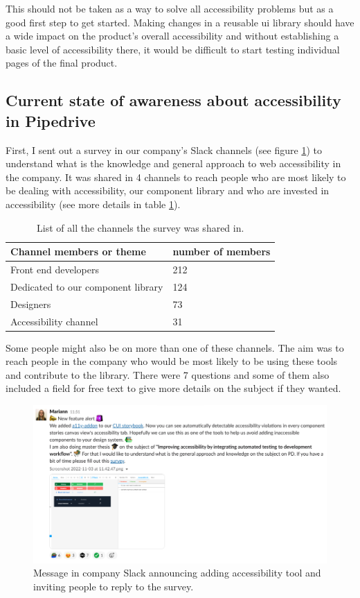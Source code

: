 \documentclass{master_thesis}
\begin{document}
This should not be taken as a way to solve all accessibility problems but as a good first step to get started. Making changes in a reusable \ac{ui} library should have a wide impact on the product's overall accessibility and without establishing a basic level of accessibility there, it would be difficult to start testing individual pages of the final product.

\subsection{Current state of awareness about accessibility in Pipedrive}

First, I sent out a survey in our company's Slack channels (see figure \ref{fig:slack-message}) to understand what is the knowledge and general approach to web accessibility in the company. It was shared in 4 channels to reach people who are most likely to be dealing with accessibility, our component library and who are invested in accessibility (see more details in table \ref{table:survey-shared}).

\begin{table}[H]
	\centering
	\begin{tabular}{|l|l|}
		\hline
		\textbf{Channel members or theme} & \textbf{number of members}  \\
		\hline
		Front end developers  & 212  \\
		\hline
		Dedicated to our component library  & 124  \\
		\hline
		Designers  & 73  \\
		\hline
		Accessibility channel  & 31  \\
		\hline
	\end{tabular}
	\caption{List of all the channels the survey was shared in.}
	\label{table:survey-shared}
\end{table}

Some people might also be on more than one of these channels. The aim was to reach people in the company who would be most likely to be using these tools and contribute to the library. There were 7 questions and some of them also included a field for free text to give more details on the subject if they wanted.

\begin{figure}[H]
	\centering
	\includegraphics[width=\textwidth]{img/survey.png}
	\caption{Message in company Slack announcing adding accessibility tool and inviting people to reply to the survey.}
	\label{fig:slack-message}
\end{figure}
\end{document}
